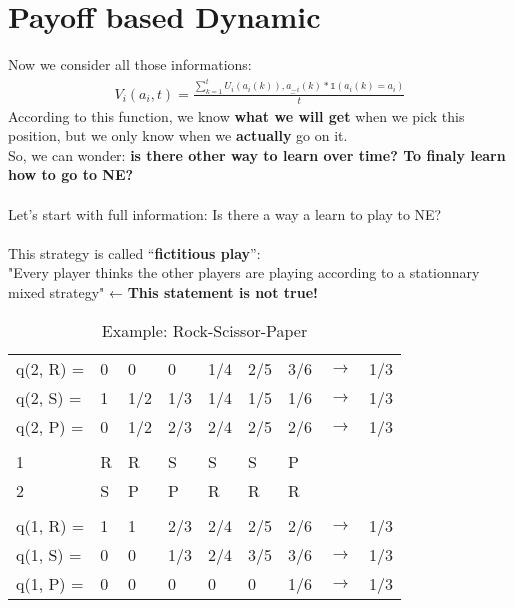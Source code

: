 \section{Payoff based Dynamic}
Now we consider all those informations:
\begin{equation}\label{eq:12}
\begin{aligned}
V_i(a_i, t) = \frac{\sum_{k = 1}^t U_i(a_i(k)), \underset{-}{a_{-i}}(k) * \mathbb{1}(a_i(k) = a_i)}{t}
\end{aligned}
\end{equation}
According to this function, we know \textbf{what we will get} when we pick this position, but we only know when we \textbf{actually} go on it.\\
So, we can wonder: \textbf{is there other way to learn over time? To finaly learn how to go to NE?}\\
\\
Let's start with full information: Is there a way a learn to play to NE?\\
\\
This strategy is called “\textbf{fictitious play}”:\\
"Every player thinks the other players are playing according to a stationnary mixed strategy" ← \textbf{This statement is not true!}
\begin{table}
    \centering
	\begin{tabular}{| l | l | l | l | l | l | l | l | l |}
\hline
q(2, R) = & 0 & 0 & 0 & 1/4 & 2/5 & 3/6 & $\rightarrow$ & 1/3\\
q(2, S) = & 1 & 1/2 & 1/3 & 1/4 & 1/5 & 1/6 & $\rightarrow$ & 1/3\\
q(2, P) = & 0 & 1/2 & 2/3 & 2/4 & 2/5 & 2/6 & $\rightarrow$ & 1/3\\ \hline
  &   &   &   &   &   &   & &\\
1 & R & R & S & S & S & P & &\\
2 & S & P & P & R & R & R & &\\
  &   &   &   &   &   &   & &\\ \hline
q(1, R) = & 1 & 1 & 2/3 & 2/4 & 2/5 & 2/6 & $\rightarrow$ & 1/3\\
q(1, S) = & 0 & 0 & 1/3 & 2/4 & 3/5 & 3/6 & $\rightarrow$ & 1/3\\
q(1, P) = & 0 & 0 & 0 & 0 & 0 & 1/6 & $\rightarrow$ & 1/3\\ \hline
	\end{tabular}
	\caption{Example: Rock-Scissor-Paper}\label{tab:a} 
\end{table}\\
